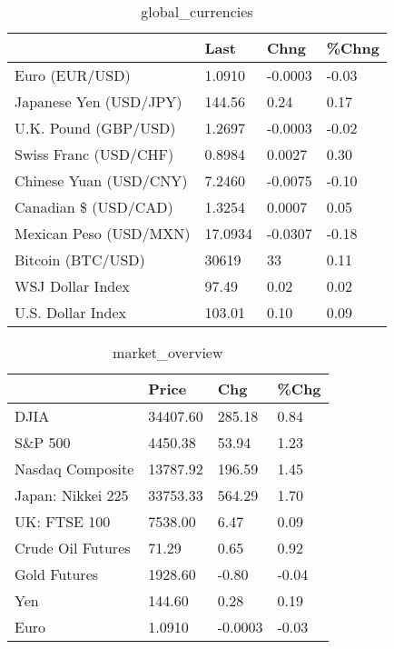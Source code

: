 \documentclass{article}%
\begin{document}
%


\begin{table}[htbp]%
\caption{global\_currencies}%
\centering%
\begin{adjustbox}{width=1\textwidth}%
\begin{tabular}{llll}
\toprule
                       &    Last &    Chng & \%Chng \\
\midrule
        Euro (EUR/USD) &  1.0910 & -0.0003 & -0.03 \\
Japanese Yen (USD/JPY) &  144.56 &    0.24 &  0.17 \\
  U.K. Pound (GBP/USD) &  1.2697 & -0.0003 & -0.02 \\
 Swiss Franc (USD/CHF) &  0.8984 &  0.0027 &  0.30 \\
Chinese Yuan (USD/CNY) &  7.2460 & -0.0075 & -0.10 \\
  Canadian \$ (USD/CAD) &  1.3254 &  0.0007 &  0.05 \\
Mexican Peso (USD/MXN) & 17.0934 & -0.0307 & -0.18 \\
     Bitcoin (BTC/USD) &   30619 &      33 &  0.11 \\
      WSJ Dollar Index &   97.49 &    0.02 &  0.02 \\
     U.S. Dollar Index &  103.01 &    0.10 &  0.09 \\
\bottomrule
\end{tabular}
%
\end{adjustbox}%
\end{table}

%


\begin{table}[htbp]%
\caption{market\_overview}%
\centering%
\begin{adjustbox}{width=1\textwidth}%
\begin{tabular}{llll}
\toprule
                  &    Price &     Chg &  \%Chg \\
\midrule
             DJIA & 34407.60 &  285.18 &  0.84 \\
          S\&P 500 &  4450.38 &   53.94 &  1.23 \\
 Nasdaq Composite & 13787.92 &  196.59 &  1.45 \\
Japan: Nikkei 225 & 33753.33 &  564.29 &  1.70 \\
     UK: FTSE 100 &  7538.00 &    6.47 &  0.09 \\
Crude Oil Futures &    71.29 &    0.65 &  0.92 \\
     Gold Futures &  1928.60 &   -0.80 & -0.04 \\
              Yen &   144.60 &    0.28 &  0.19 \\
             Euro &   1.0910 & -0.0003 & -0.03 \\
\bottomrule
\end{tabular}
%
\end{adjustbox}%
\end{table}

%
\end{document}
